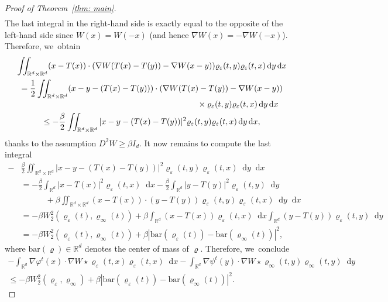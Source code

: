 \documentclass[10pt]{amsart}
\newcommand{\dx}[1]{\mathop{}\!\mathrm{d} #1}
\newcommand{\R}{\mathbb{R}}
\theoremstyle{plain}
\theoremstyle{remark}
\begin{document}
\begin{proof}[Proof of Theorem~\ref{thm: main}]
\begin{multline*}
\end{multline*}
The last integral in the right-hand side is exactly equal to the opposite of the left-hand side since $W(x)=W(-x)$ (and hence $\nabla W(x)=-\nabla W(-x)$). Therefore, we~obtain
\begin{multline*}
\iint_{\R^d\times\R^d} (x- T(x))\cdot (\nabla W(T(x)-T(y)) - \nabla W(x-y)) \varrho_\varepsilon(t,y) \varrho_\varepsilon(t,x) \dx y \dx x\\
=\frac 12 \iint_{\R^d\times\R^d} (x-y - (T(x)-T(y)))\cdot (\nabla W(T(x)-T(y)) - \nabla W(x-y))\\[-3pt]
\shoveright{{}\times \varrho_\varepsilon(t,y) \varrho_\varepsilon(t,x) \dx y \dx x}\\
\leq -\frac \beta 2 \iint_{\R^d\times\R^d}|x-y - (T(x)-T(y))|^2\varrho_\varepsilon(t,y) \varrho_\varepsilon(t,x) \dx y \dx x,
\end{multline*}
thanks to the assumption $D^2W\geq \beta I_d$.
It now remains to compute the last integral
\begin{equation*}
\begin{split}
-&\frac \beta 2 \iint_{\R^d\times\R^d}|x-y - (T(x)-T(y))|^2\varrho_\varepsilon(t,y) \varrho_\varepsilon(t,x) \dx y \dx x\\[5pt]
&=- \frac\beta 2 \int_{\R^d} |x-T(x)|^2 \varrho_\varepsilon(t,x)\dx x -\frac \beta 2 \int_{\R^d} |y-T(y)|^2\varrho_{\varepsilon}(t,y) \dx y\\
&\qquad\quad + \beta \iint_{\R^d\times\R^d}(x-T(x))\cdot (y-T(y))\varrho_\varepsilon(t,y) \varrho_\varepsilon(t,x) \dx y \dx x\\
&=-\beta W_2^2(\varrho_\varepsilon(t), \varrho_\infty(t)) + \beta \int_{\R^d} (x - T(x))\varrho_\varepsilon(t,x) \dx x\int_{\R^d} (y - T(y))\varrho_{\varepsilon}(t,y) \dx y\\[5pt]
&=-\beta W_2^2(\varrho_\varepsilon(t), \varrho_\infty(t)) + \beta|\mathrm{bar}(\varrho_\varepsilon(t))- \mathrm{bar}(\varrho_\infty(t))|^2,
\end{split}
\end{equation*}
where $\mathrm{bar}(\varrho)\in\R^d$ denotes the center of mass of $\varrho$. Therefore, we~conclude
\begin{multline*}
-\! \int_{\R^d}\!\! \nabla \varphi^t (x) \cdot \nabla W\star \varrho_\varepsilon (t,x) \varrho_\varepsilon(t,x) \dx x - \!\int_{\R^d}\!\! \nabla \psi^t (y) \cdot \nabla W\star \varrho_\infty (t,y) \varrho_\infty(t,y) \dx y\\[3pt]
\leq -\beta W_2^2(\varrho_\varepsilon,\varrho_\infty) + \beta |\mathrm{bar}(\varrho_\varepsilon(t))- \mathrm{bar}(\varrho_\infty(t))|^2.

\end{multline*}
\end{proof}
\end{document}
